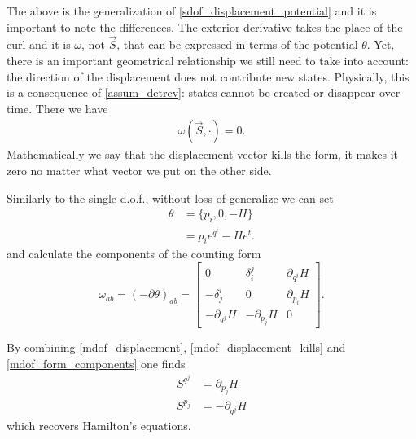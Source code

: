 \documentclass[10pt,twocolumn, nofootinbib]{revtex4-2}
\begin{document}
The above is the generalization of \ref{sdof_displacement_potential} and it is important to note the differences. The exterior derivative takes the place of the curl and it is $\omega$, not $\vec{S}$, that can be expressed in terms of the potential $\theta$. Yet, there is an important geometrical relationship we still need to take into account: the direction of the displacement does not contribute new states. Physically, this is a consequence of \ref{assum_detrev}: states cannot be created or disappear over time. There we have
\begin{align}\label{mdof_displacement_kills}
	\omega(\vec{S}, \cdot) = 0.
\end{align}
Mathematically we say that the displacement vector kills the form, it makes it zero no matter what vector we put on the other side.

Similarly to the single d.o.f., without loss of generalize we can set
\begin{equation}\label{mdof_potential_expression}
\begin{aligned}
	\theta &= \{p_i, 0, -H\} \\
	&= p_i e^{q^i} - H e^t.
\end{aligned}
\end{equation}
and calculate the components of the counting form
\begin{equation}\label{mdof_form_components}
	\omega_{ab} = (-\partial\theta)_{ab} = \begin{bmatrix}
		0 & \delta^j_i & \partial_{q^i} H \\
		-\delta^i_j & 0 & \partial_{p_i} H \\
		-\partial_{q^j} H & -\partial_{p_j} H & 0
	\end{bmatrix}.
\end{equation}

By combining \ref{mdof_displacement}, \ref{mdof_displacement_kills} and \ref{mdof_form_components} one finds
\begin{equation}\label{mdof_Ham_eq}
\begin{aligned}
	S^{q^j} &= \partial_{p_j} H \\
	S^{p_j} &= - \partial_{q^j} H
\end{aligned}
\end{equation}
which recovers Hamilton's equations.
\end{document}
